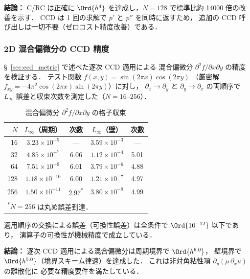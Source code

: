 \noindent\textbf{結論：}
C/RC は正確に $\Ord{h^4}$ を達成し，$N = 128$ で標準比約 14000 倍の改善を示す．
CCD は 1 回の求解で $p'$ と $p''$ を同時に返すため，
追加の CCD 呼び出しは一切不要（ゼロコスト精度改善）である．

\subsubsection{2D 混合偏微分の CCD 精度}
\label{sec:verify_mixed_partial}

§~\ref{sec:ccd_metric} で述べた逐次 CCD 適用による
混合偏微分 $\partial^2 f / \partial x \partial y$ の精度を検証する．
テスト関数 $f(x,y) = \sin(2\pi x)\cos(2\pi y)$
（厳密解 $f_{xy} = -4\pi^2 \cos(2\pi x)\sin(2\pi y)$）に対し，
$\partial_x \to \partial_y$ と $\partial_y \to \partial_x$ の両順序で
$L_\infty$ 誤差と収束次数を測定した（$N = 16$--$256$）．

\begin{table}[htbp]
\centering
\caption{混合偏微分 $\partial^2 f / \partial x \partial y$ の格子収束}
\label{tab:mixed_partial}
\renewcommand{\arraystretch}{1.2}
\small
\begin{tabular}{rcccc}
\toprule
$N$ & $L_\infty$（周期） & 次数 & $L_\infty$（壁） & 次数 \\
\midrule
 16 & $3.23 \times 10^{-5}$ & ---  & $3.59 \times 10^{-3}$ & --- \\
 32 & $4.85 \times 10^{-7}$ & 6.06 & $1.12 \times 10^{-4}$ & 5.01 \\
 64 & $7.51 \times 10^{-9}$ & 6.01 & $3.79 \times 10^{-6}$ & 4.88 \\
128 & $1.18 \times 10^{-10}$ & 6.00 & $1.21 \times 10^{-7}$ & 4.97 \\
256 & $1.50 \times 10^{-11}$ & 2.97\textsuperscript{*} & $3.80 \times 10^{-9}$ & 4.99 \\
\bottomrule
\multicolumn{5}{l}{\footnotesize \textsuperscript{*}$N{=}256$ は丸め誤差到達．} \\
\end{tabular}
\end{table}

適用順序の交換による誤差（可換性誤差）は全条件で $\Ord{10^{-12}}$ 以下であり，
演算子の可換性が機械精度で成立している．

\noindent\textbf{結論：}
逐次 CCD 適用による混合偏微分は周期境界で $\Ord{h^{6.0}}$，
壁境界で $\Ord{h^{5.0}}$（境界スキーム律速）を達成した．
これは非対角粘性項 $\partial_y(\mu\,\partial_x u)$ の離散化に
必要な精度要件を満たしている．
